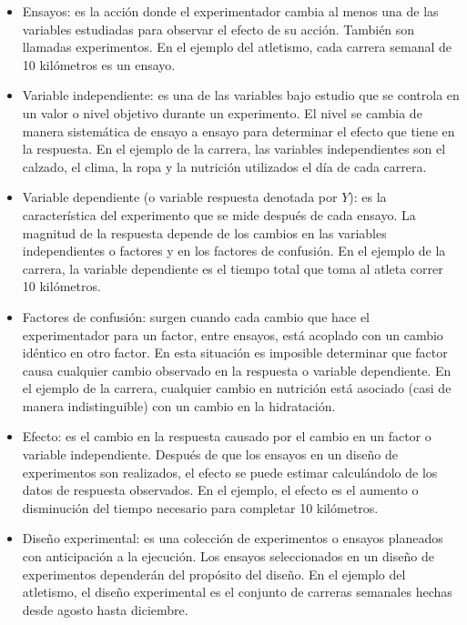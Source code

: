 \begin{itemize}
	\item Ensayos: es la acción donde el experimentador cambia al menos una de las variables estudiadas para observar el efecto de su acción. También son llamadas experimentos. En el ejemplo del atletismo, cada carrera semanal de 10 kilómetros es un ensayo. 
	
	\item Variable independiente: es una de las variables bajo estudio que se controla en un valor o nivel objetivo durante un experimento. El nivel se cambia de manera sistemática de ensayo a ensayo para determinar el efecto que tiene en la respuesta. En el ejemplo de la carrera, las variables independientes son el calzado, el clima, la ropa y la nutrición utilizados el día de cada carrera. 
	
	\item Variable dependiente (o variable respuesta denotada por $Y$): es la característica del experimento que se mide después de cada ensayo. La magnitud de la respuesta depende de los cambios en las variables independientes o factores y en los factores de confusión. En el ejemplo de la carrera, la variable dependiente es el tiempo total que toma al atleta correr 10 kilómetros. 
	
	\item Factores de confusión: surgen cuando cada cambio que hace el experimentador para un factor, entre ensayos, está acoplado con un cambio idéntico en otro factor. En esta situación es imposible determinar que factor causa cualquier cambio observado en la respuesta o variable dependiente. En el ejemplo de la carrera, cualquier cambio en nutrición está asociado (casi de manera indistinguible) con un cambio en la hidratación.
	
	\item Efecto: es el cambio en la respuesta causado por el cambio en un factor o variable independiente. Después de que los ensayos en un diseño de experimentos son realizados, el efecto se puede estimar calculándolo de los datos de respuesta observados. En el ejemplo, el efecto es el aumento o disminución del tiempo necesario para completar 10 kilómetros. 
	
	\item Diseño experimental: es una colección de experimentos o ensayos planeados con anticipación a la ejecución. Los ensayos seleccionados en un diseño de experimentos dependerán del propósito del diseño. En el ejemplo del atletismo, el diseño experimental es el conjunto de carreras semanales hechas desde agosto hasta diciembre. 
	

\end{itemize}

